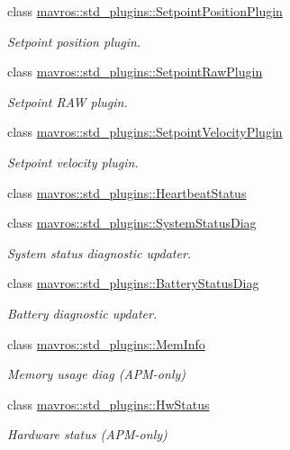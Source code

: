 \begin{DoxyCompactItemize}
class \mbox{\hyperlink{classmavros_1_1std__plugins_1_1SetpointPositionPlugin}{mavros\+::std\+\_\+plugins\+::\+Setpoint\+Position\+Plugin}}
\begin{DoxyCompactList}\small\item\em Setpoint position plugin. \end{DoxyCompactList}\item 
class \mbox{\hyperlink{classmavros_1_1std__plugins_1_1SetpointRawPlugin}{mavros\+::std\+\_\+plugins\+::\+Setpoint\+Raw\+Plugin}}
\begin{DoxyCompactList}\small\item\em Setpoint R\+AW plugin. \end{DoxyCompactList}\item 
class \mbox{\hyperlink{classmavros_1_1std__plugins_1_1SetpointVelocityPlugin}{mavros\+::std\+\_\+plugins\+::\+Setpoint\+Velocity\+Plugin}}
\begin{DoxyCompactList}\small\item\em Setpoint velocity plugin. \end{DoxyCompactList}\item 
class \mbox{\hyperlink{classmavros_1_1std__plugins_1_1HeartbeatStatus}{mavros\+::std\+\_\+plugins\+::\+Heartbeat\+Status}}
\item 
class \mbox{\hyperlink{classmavros_1_1std__plugins_1_1SystemStatusDiag}{mavros\+::std\+\_\+plugins\+::\+System\+Status\+Diag}}
\begin{DoxyCompactList}\small\item\em System status diagnostic updater. \end{DoxyCompactList}\item 
class \mbox{\hyperlink{classmavros_1_1std__plugins_1_1BatteryStatusDiag}{mavros\+::std\+\_\+plugins\+::\+Battery\+Status\+Diag}}
\begin{DoxyCompactList}\small\item\em Battery diagnostic updater. \end{DoxyCompactList}\item 
class \mbox{\hyperlink{classmavros_1_1std__plugins_1_1MemInfo}{mavros\+::std\+\_\+plugins\+::\+Mem\+Info}}
\begin{DoxyCompactList}\small\item\em Memory usage diag (A\+P\+M-\/only) \end{DoxyCompactList}\item 
class \mbox{\hyperlink{classmavros_1_1std__plugins_1_1HwStatus}{mavros\+::std\+\_\+plugins\+::\+Hw\+Status}}
\begin{DoxyCompactList}\small\item\em Hardware status (A\+P\+M-\/only) \end{DoxyCompactList}\item 

\end{DoxyCompactItemize}
